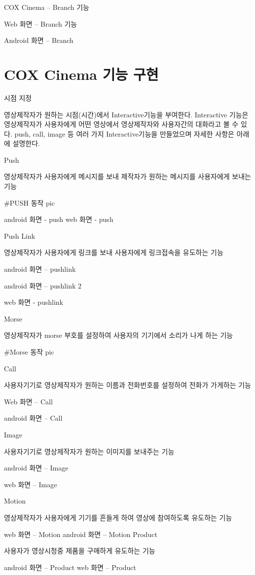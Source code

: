 \documentclass{oblivoir}
\begin{document}
COX Cinema – Branch 기능

Web 화면 – Branch 기능

Android 화면 – Branch 

\section{ COX Cinema 기능 구현}

시점 지정

영상제작자가 원하는 시점(시간)에서 Interactive기능을 부여한다. Interactive 기능은 영상제작자가 사용자에게 어떤 영상에서 영상제작자와 사용자간의 대화라고 볼 수 있다. push, call, image 등 여러 가지 Interactive기능을 만들었으며 자세한 사항은 아래에 설명한다.  

Push 

영상제작자가 사용자에게 메시지를 보내 제작자가 원하는 메시지를 사용자에게 보내는 기능

#PUSH 동작 pic

android 화면 - push
   web 화면 - push

Push Link 

영상제작자가 사용자에게 링크를 보내 사용자에게 링크접속을 유도하는 기능

android 화면 – pushlink

android 화면 – pushlink 2

web 화면 - pushlink

Morse

영상제작자가 morse 부호를 설정하여 사용자의 기기에서 소리가 나게 하는 기능

#Morse 동작 pic

Call 

사용자기기로 영상제작자가 원하는 이름과 전화번호를 설정하여 전화가 가게하는 기능

Web 화면 – Call

android 화면 – Call

Image 

사용자기기로 영상제작자가 원하는 이미지를 보내주는 기능

android 화면 – Image

web 화면 – Image

Motion 

영상제작자가 사용자에게 기기를 흔들게 하여 영상에 참여하도록 유도하는 기능

web 화면 – Motion
        android 화면 – Motion
                      Product 

사용자가 영상시청중 제품을 구매하게 유도하는 기능 

android 화면 – Product
 web 화면 – Product
\end{document}
